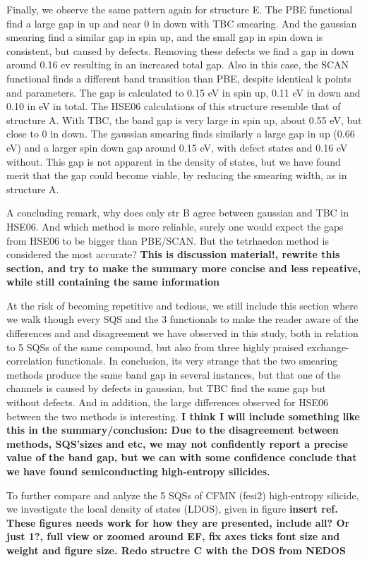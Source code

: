 Finally, we observe the same pattern again for structure E. The PBE functional find a large gap in up and near 0 in down with TBC smearing. And the gaussian smearing find a similar gap in spin up, and the small gap in spin down is consistent, but caused by defects. Removing these defects we find a gap in down around 0.16 ev resulting in an increased total gap. Also in this case, the SCAN functional finds a different band transition than PBE, despite identical k points and parameters. The gap is calculated to 0.15 eV in spin up, 0.11 eV in down and 0.10 in eV in total. The HSE06 calculations of this structure resemble that of structure A. With TBC, the band gap is very large in spin up, about 0.55 eV, but close to 0 in down. The gaussian smearing finds similarly a large gap in up (0.66 eV) and a larger spin down gap around 0.15 eV, with defect states and 0.16 eV without. This gap is not apparent in the density of states, but we have found merit that the gap could become viable, by reducing the smearing width, as in structure A.  

A concluding remark, why does only str B agree between gaussian and TBC in HSE06. And which method is more reliable, surely one would expect the gaps from HSE06 to be bigger than PBE/SCAN. But the tetrhaedon method is considered the most accurate? \textbf{This is discussion material!, rewrite this section, and try to make the summary more concise and less repeative, while still containing the same information}

At the risk of becoming repetitive and tedious, we still include this section where we walk though every SQS and the 3 functionals to make the reader aware of the differences and and disagreement we have observed in this study, both in relation to 5 SQSs of the same compound, but also from three highly praised exchange-correlation functionals.  
In conclusion, its very strange that the two smearing methods produce the same band gap in several instances, but that one of the channels is caused by defects in gaussian, but TBC find the same gap but without defects. And in addition, the large differences observed for HSE06 between the two methods is interesting. \textbf{I think I will include something like this in the summary/conclusion: Due to the disagreement between methods, SQS'sizes and etc, we may not confidently report a precise value of the band gap, but we can with some confidence conclude that we have found semiconducting high-entropy silicides.}   


To further compare and anlyze the 5 SQSs of CFMN (fesi2) high-entropy silicide, we investigate the local density of states (LDOS), given in figure \textbf{insert ref.} \textbf{These figures needs work for how they are presented, include all? Or just 1?, full view or zoomed around EF, fix axes ticks font size and weight and figure size. Redo structre C with the DOS from NEDOS}


